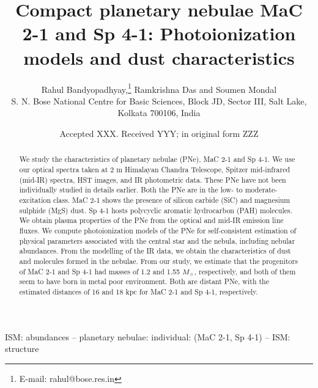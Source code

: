 \documentclass[a4paper,fleqn,usenatbib]{mnras}
\title[Study of planetary nebulae MaC 2-1 and Sp 4-1]{Compact planetary nebulae MaC 2-1 and Sp 4-1: Photoionization models and dust characteristics}
\author[Rahul Bandyopadhyay et al.]{
Rahul Bandyopadhyay,\thanks{E-mail: rahul@bose.res.in}
Ramkrishna Das and
Soumen Mondal
\\
S. N. Bose National Centre for Basic Sciences, Block JD, Sector III, Salt Lake, Kolkata 700106, India\\
}
\date{Accepted XXX. Received YYY; in original form ZZZ}
\begin{document}
\label{firstpage}
\pagerange{\pageref{firstpage}--\pageref{lastpage}}
\maketitle

\begin{abstract}
We study the characteristics of planetary nebulae (PNe), MaC 2-1 and Sp 4-1. We use our optical spectra taken at 2 m Himalayan Chandra Telescope, Spitzer mid-infrared (mid-IR) spectra, HST images, and IR photometric data. These PNe have not been individually studied in details earlier. Both the PNe are in the low- to moderate-excitation class. MaC 2-1 shows the presence of silicon carbide (SiC) and magnesium sulphide (MgS) dust. Sp 4-1 hosts polycyclic aromatic hydrocarbon (PAH) molecules. We obtain plasma properties of the PNe from the optical and mid-IR emission line fluxes. We compute photoionization models of the PNe for self-consistent estimation of physical parameters associated with the central star and the nebula, including nebular abundances. From the modelling of the IR data, we obtain the characteristics of dust and molecules formed in the nebulae. From our study, we estimate that the progenitors of MaC 2-1 and Sp 4-1 had masses of 1.2 and 1.55 $M_{\sun}$, respectively, and both of them seem to have born in metal poor environment. Both are distant PNe, with the estimated distances of 16 and 18 kpc for MaC 2-1 and Sp 4-1, respectively.       
\end{abstract}

\begin{keywords}
ISM: abundances -- planetary nebulae: individual: (MaC 2-1, Sp 4-1) -- ISM: structure
\end{keywords}
\end{document}
